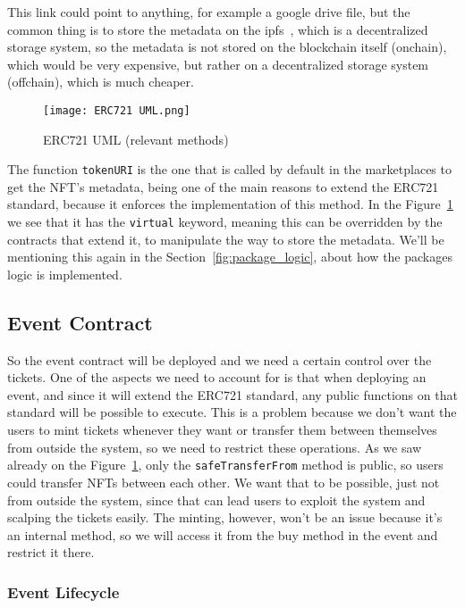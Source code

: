 This link could point to anything, for example a google drive file, but the
common thing is to store the metadata on the \gls{ipfs}~\cite{ipfs}, which is a
decentralized storage system, so the metadata is not stored on the blockchain
itself (onchain), which would be very expensive, but rather on a decentralized
storage system (offchain), which is much cheaper.

\begin{figure}[H]
	\texttt{[image: ERC721 UML.png]}
	\centering
	\caption{ERC721 UML (relevant methods)}\label{fig:erc721_uml}
\end{figure}

The function \texttt{tokenURI} is the one that is called by default in the
marketplaces to get the NFT's metadata, being one of the main reasons to extend
the ERC721 standard, because it enforces the implementation of this method. In
the Figure~\ref{fig:erc721_uml} we see that it has the \texttt{virtual}
keyword, meaning this can be overridden by the contracts that extend it, to
manipulate the way to store the metadata. We'll be mentioning this again in the
Section~\ref{fig:package_logic}, about how the packages logic is implemented.

\subsection{Event Contract}\label{subsec:event_contract}

So the event contract will be deployed and we need a certain control over the
tickets. One of the aspects we need to account for is that when deploying an
event, and since it will extend the ERC721 standard, any public functions on
that standard will be possible to execute. This is a problem because we don't
want the users to mint tickets whenever they want or transfer them between
themselves from outside the system, so we need to restrict these operations. As
we saw already on the Figure~\ref{fig:erc721_uml}, only the
\texttt{safeTransferFrom} method is public, so users could transfer NFTs
between each other. We want that to be possible, just not from outside the
system, since that can lead users to exploit the system and scalping the
tickets easily. The minting, however, won't be an issue because it's an
internal method, so we will access it from the buy method in the event and
restrict it there.

\subsubsection{Event Lifecycle}\label{subsubsec:event_lifecycle}

